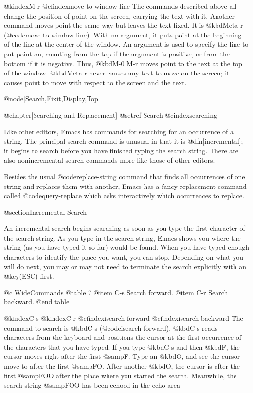 {{{{{{@kindex{M-r}
@cfindex{move-to-window-line}
  The commands described above all change the position of point on the
screen, carrying the text with it.  Another command moves point the same
way but leaves the text fixed.  It is @kbd{Meta-r}
(@code{move-to-window-line}).  With no argument, it puts point at the
beginning of the line at the center of the window.  An argument is used to
specify the line to put point on, counting from the top if the argument is
positive, or from the bottom if it is negative.  Thus, @kbd{M-0 M-r} moves
point to the text at the top of the window.  @kbd{Meta-r} never causes any
text to move on the screen; it causes point to move with respect to the
screen and the text.

@node[Search,Fixit,Display,Top]

@chapter[Searching and Replacement]
@setref Search
@cindex{searching}

  Like other editors, Emacs has commands for searching for an occurrence of
a string.  The principal search command is unusual in that it is
@dfn[incremental]; it begins to search before you have finished typing the
search string.  There are also nonincremental search commands more like
those of other editors.

  Besides the usual @code{replace-string} command that finds all
occurrences of one string and replaces them with another, Emacs has a
fancy replacement command called @code{query-replace} which asks
interactively which occurrences to replace.

@section{Incremental Search}

  An incremental search begins searching as soon as you type the first
character of the search string.  As you type in the search string, Emacs
shows you where the string (as you have typed it so far) would be found. 
When you have typed enough characters to identify the place you want, you
can stop.  Depending on what you will do next, you may or may not need to
terminate the search explicitly with an @key(ESC) first.

@c WideCommands
@table 7
@item C-s
Search forward.
@item C-r
Search backward.
@end table

@kindex{C-s}
@kindex{C-r}
@cfindex{isearch-forward}
@cfindex{isearch-backward}
  The command to search is @kbd{C-s} (@code{isearch-forward}).
@kbd{C-s} reads characters from the keyboard and positions the cursor at
the first occurrence of the characters that you have typed.  If you type
@kbd{C-s} and then @kbd{F}, the cursor moves right after the first
@samp{F}.  Type an @kbd{O}, and see the cursor move to after the first
@samp{FO}.  After another @kbd{O}, the cursor is after the first @samp{FOO}
after the place where you started the search.  Meanwhile, the search string
@samp{FOO} has been echoed in the echo area.

}}}}}}
